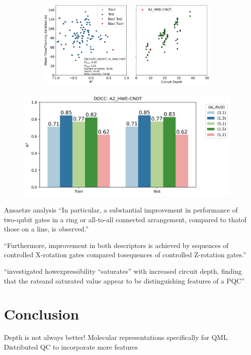 \documentclass[journal=jacsat,manuscript=article]{achemso}
\begin{document}
\begin{figure}[H]
\begin{subfigure}[b]{0.49\textwidth}
		\caption{}
		\label{fig:ddccboxplots}
	\end{subfigure}
	\hfill
	\begin{subfigure}[b]{0.49\textwidth}
		\centering
		\includegraphics[width=\linewidth]{../images/DDCC/AllDDCC5_circuitdepth_R2_vs_iterationtime}
		\caption{}
		\label{fig:allddcc5circuitdepthr2vsiterationtime}
	\end{subfigure}	
	\caption{}
	\label{fig:ddcc_all_analysis}	
\end{figure}




\begin{figure}[H]
	\centering
	\includegraphics[width=\linewidth]{../images/DDCC/DDCC_RUDAL}
	\caption{}
	\label{fig:ddccrudal}
\end{figure}




Ansaetze analysis \cite{sim_expressibility_2019}
``In particular, a substantial improvement in performance of two-qubit gates in a ring or all-to-all connected arrangement, compared to thatof those on a line, is observed.''

``Furthermore, improvement in both descriptors is achieved by sequences of controlled X-rotation gates compared tosequences of controlled Z-rotation gates.''

``investigated howexpressibility “saturates” with increased circuit depth, finding that the rateand saturated value appear to be distinguishing features of a PQC''



\section{Conclusion}
Depth is not always better!
Molecular representations specifically for QML
Distributed QC to incorporate more features


\end{document}
